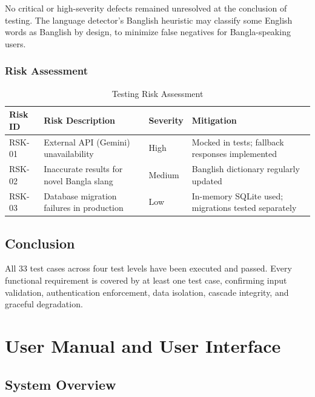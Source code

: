 \documentclass[12pt,a4paper]{report}
\begin{document}
\begin{itemize}
No critical or high-severity defects remained unresolved at the conclusion of testing. The language detector's Banglish heuristic may classify some English words as Banglish by design, to minimize false negatives for Bangla-speaking users.

\subsection{Risk Assessment}

\begin{table}[H]
\centering
\caption{Testing Risk Assessment}
\label{tab:risk_assessment}
\begin{tabularx}{\textwidth}{|l|X|l|X|}
\hline
\textbf{Risk ID} & \textbf{Risk Description} & \textbf{Severity} & \textbf{Mitigation} \\
\hline
RSK-01 & External API (Gemini) unavailability & High & Mocked in tests; fallback responses implemented \\
\hline
RSK-02 & Inaccurate results for novel Bangla slang & Medium & Banglish dictionary regularly updated \\
\hline
RSK-03 & Database migration failures in production & Low & In-memory SQLite used; migrations tested separately \\
\hline
\end{tabularx}
\end{table}

\section{Conclusion}

All 33 test cases across four test levels have been executed and passed. Every functional requirement is covered by at least one test case, confirming input validation, authentication enforcement, data isolation, cascade integrity, and graceful degradation.

\chapter{User Manual and User Interface}

\section{System Overview}


\end{itemize}
\end{document}
